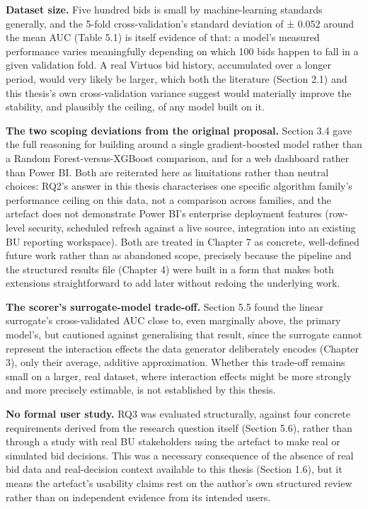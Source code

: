 \textbf{Dataset size.} Five hundred bids is small by machine-learning
standards generally, and the 5-fold cross-validation's standard
deviation of ± 0.052 around the mean AUC (Table 5.1) is itself evidence
of that: a model's measured performance varies meaningfully depending on
which 100 bids happen to fall in a given validation fold. A real Virtuos
bid history, accumulated over a longer period, would very likely be
larger, which both the literature (Section 2.1) and this thesis's own
cross-validation variance suggest would materially improve the
stability, and plausibly the ceiling, of any model built on it.

\textbf{The two scoping deviations from the original proposal.} Section
3.4 gave the full reasoning for building around a single
gradient-boosted model rather than a Random Forest-versus-XGBoost
comparison, and for a web dashboard rather than Power BI. Both are
reiterated here as limitations rather than neutral choices: RQ2's answer
in this thesis characterises one specific algorithm family's performance
ceiling on this data, not a comparison across families, and the artefact
does not demonstrate Power BI's enterprise deployment features
(row-level security, scheduled refresh against a live source,
integration into an existing BU reporting workspace). Both are treated
in Chapter 7 as concrete, well-defined future work rather than as
abandoned scope, precisely because the pipeline and the structured
results file (Chapter 4) were built in a form that makes both extensions
straightforward to add later without redoing the underlying work.

\textbf{The scorer's surrogate-model trade-off.} Section 5.5 found the
linear surrogate's cross-validated AUC close to, even marginally above,
the primary model's, but cautioned against generalising that result,
since the surrogate cannot represent the interaction effects the data
generator deliberately encodes (Chapter 3), only their average, additive
approximation. Whether this trade-off remains small on a larger, real
dataset, where interaction effects might be more strongly and more
precisely estimable, is not established by this thesis.

\textbf{No formal user study.} RQ3 was evaluated structurally, against
four concrete requirements derived from the research question itself
(Section 5.6), rather than through a study with real BU stakeholders
using the artefact to make real or simulated bid decisions. This was a
necessary consequence of the absence of real bid data and real-decision
context available to this thesis (Section 1.6), but it means the
artefact's usability claims rest on the author's own structured review
rather than on independent evidence from its intended users.


